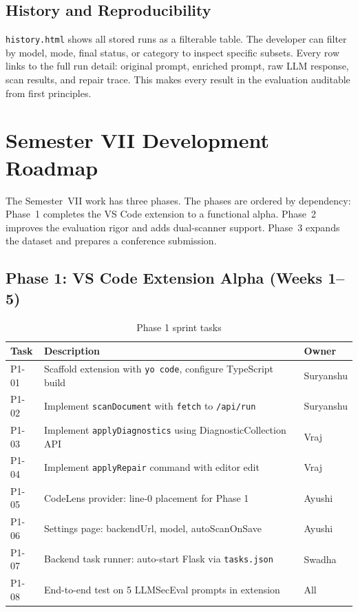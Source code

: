 \documentclass[12pt,a4paper]{report}
\begin{document}
\subsection{History and Reproducibility}

\texttt{history.html} shows all stored runs as a filterable table. The developer
can filter by model, mode, final status, or category to inspect specific subsets.
Every row links to the full run detail: original prompt, enriched prompt, raw LLM
response, scan results, and repair trace. This makes every result in the
evaluation auditable from first principles.

\section{Semester VII Development Roadmap}
\label{sec:semvii}

The Semester~VII work has three phases. The phases are ordered by dependency:
Phase~1 completes the VS Code extension to a functional alpha. Phase~2 improves
the evaluation rigor and adds dual-scanner support. Phase~3 expands the dataset
and prepares a conference submission.

\subsection{Phase 1: VS Code Extension Alpha (Weeks 1--5)}

\begin{table}[H]
\centering
\caption{Phase 1 sprint tasks}
\label{tab:phase1}
\renewcommand{\arraystretch}{1.3}
\begin{tabularx}{\textwidth}{@{}lXl@{}}
\toprule
\textbf{Task} & \textbf{Description} & \textbf{Owner} \\
\midrule
P1-01 & Scaffold extension with \texttt{yo code}, configure TypeScript build & Suryanshu \\
P1-02 & Implement \texttt{scanDocument} with \texttt{fetch} to \texttt{/api/run} & Suryanshu \\
P1-03 & Implement \texttt{applyDiagnostics} using DiagnosticCollection API & Vraj \\
P1-04 & Implement \texttt{applyRepair} command with editor edit & Vraj \\
P1-05 & CodeLens provider: line-0 placement for Phase 1 & Ayushi \\
P1-06 & Settings page: backendUrl, model, autoScanOnSave & Ayushi \\
P1-07 & Backend task runner: auto-start Flask via \texttt{tasks.json} & Swadha \\
P1-08 & End-to-end test on 5 LLMSecEval prompts in extension & All \\
\bottomrule
\end{tabularx}
\end{table}
\end{document}
